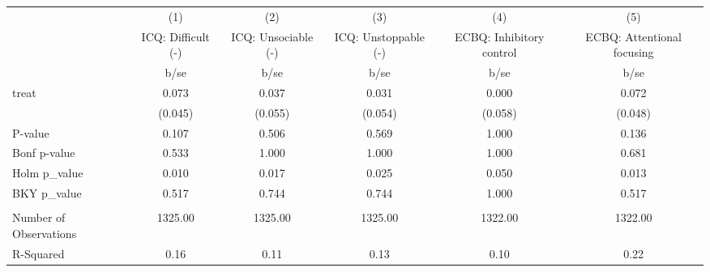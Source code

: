 {
\def\sym#1{\ifmmode^{#1}\else\(^{#1}\)\fi}
\begin{tabular}{l*{5}{c}}
\hline\hline
                    &\multicolumn{1}{c}{(1)}&\multicolumn{1}{c}{(2)}&\multicolumn{1}{c}{(3)}&\multicolumn{1}{c}{(4)}&\multicolumn{1}{c}{(5)}\\
                    &\multicolumn{1}{c}{ICQ: Difficult (-)}&\multicolumn{1}{c}{ICQ: Unsociable (-)}&\multicolumn{1}{c}{ICQ: Unstoppable (-)}&\multicolumn{1}{c}{ECBQ: Inhibitory control}&\multicolumn{1}{c}{ECBQ: Attentional focusing}\\
                    &        b/se         &        b/se         &        b/se         &        b/se         &        b/se         \\
\hline
treat               &       0.073         &       0.037         &       0.031         &       0.000         &       0.072         \\
                    &     (0.045)         &     (0.055)         &     (0.054)         &     (0.058)         &     (0.048)         \\
\hline
P-value             &       0.107         &       0.506         &       0.569         &       1.000         &       0.136         \\
Bonf p-value        &       0.533         &       1.000         &       1.000         &       1.000         &       0.681         \\
Holm p\_value        &       0.010         &       0.017         &       0.025         &       0.050         &       0.013         \\
BKY p\_value         &       0.517         &       0.744         &       0.744         &       1.000         &       0.517         \\
                    &                     &                     &                     &                     &                     \\
Number of Observations&     1325.00         &     1325.00         &     1325.00         &     1322.00         &     1322.00         \\
R-Squared           &        0.16         &        0.11         &        0.13         &        0.10         &        0.22         \\
\hline\hline
\end{tabular}
}
